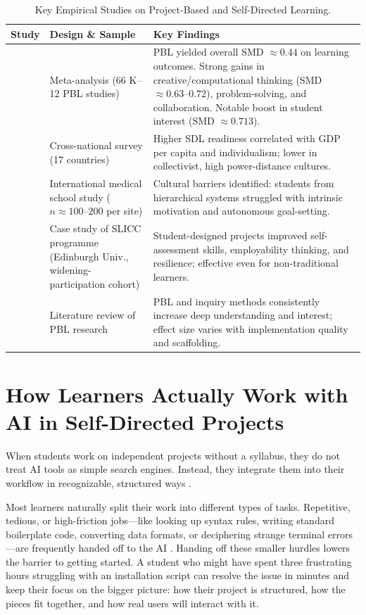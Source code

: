 \documentclass[11pt]{article}
\begin{document}
\begin{table}[htbp]
\centering
\small
\caption{Key Empirical Studies on Project-Based and Self-Directed Learning.}
\label{tab:key_studies}
\begin{tabularx}{\linewidth}{p{2.4cm} p{2.5cm} >{\raggedright\arraybackslash}X}
\toprule
\textbf{Study} & \textbf{Design \& Sample} & \textbf{Key Findings} \\
\midrule
\citet{zheng2023meta} & Meta-analysis (66 K--12 PBL studies) & PBL yielded overall SMD $\approx 0.44$ on learning outcomes. Strong gains in creative/computational thinking (SMD $\approx 0.63$--$0.72$), problem-solving, and collaboration. Notable boost in student interest (SMD $\approx 0.713$). \\
\addlinespace
\citet{guglielmino2011} & Cross-national survey (17 countries) & Higher SDL readiness correlated with GDP per capita and individualism; lower in collectivist, high power-distance cultures. \\
\addlinespace
\citet{frambach2012} & International medical school study ($n \approx 100$--$200$ per site) & Cultural barriers identified: students from hierarchical systems struggled with intrinsic motivation and autonomous goal-setting. \\
\addlinespace
\citet{spiers2020} & Case study of SLICC programme (Edinburgh Univ., widening-participation cohort) & Student-designed projects improved self-assessment skills, employability thinking, and resilience; effective even for non-traditional learners. \\
\addlinespace
\citet{thomas2000} & Literature review of PBL research & PBL and inquiry methods consistently increase deep understanding and interest; effect size varies with implementation quality and scaffolding. \\
\bottomrule
\end{tabularx}
\end{table}

\section{How Learners Actually Work with AI in Self-Directed Projects}

When students work on independent projects without a syllabus, they do not treat AI tools as simple search engines. Instead, they integrate them into their workflow in recognizable, structured ways \citep{zheng2024}.

Most learners naturally split their work into different types of tasks. Repetitive, tedious, or high-friction jobs---like looking up syntax rules, writing standard boilerplate code, converting data formats, or deciphering strange terminal errors---are frequently handed off to the AI \citep{zheng2024,ravi2025}. Handing off these smaller hurdles lowers the barrier to getting started. A student who might have spent three frustrating hours struggling with an installation script can resolve the issue in minutes and keep their focus on the bigger picture: how their project is structured, how the pieces fit together, and how real users will interact with it.
\end{document}

